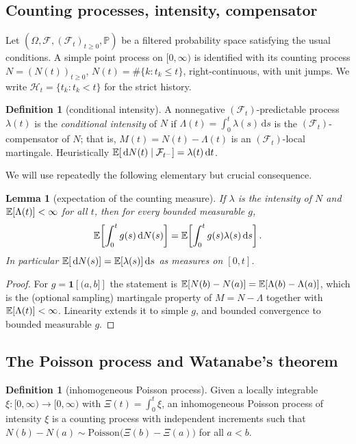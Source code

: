 \documentclass[11pt]{article}
\theoremstyle{plain}
\newtheorem{lemma}[theorem]{Lemma}
\theoremstyle{definition}
\newtheorem{definition}[theorem]{Definition}
\theoremstyle{remark}
\newcommand{\Prob}{\mathbb{P}}\newcommand{\one}{\mathbf{1}}\newcommand{\dd}{\,\mathrm{d}}
\newcommand{\Hist}{\mathcal{H}}\newcommand{\Filt}{\mathcal{F}}\newcommand{\conv}{\ast}
\newcommand{\ind}[1]{\mathbf{1}\!\left[#1\right]}
\begin{document}
\subsection{Counting processes, intensity, compensator}

Let $(\Omega,\Filt,(\Filt_t)_{t\ge0},\Prob)$ be a filtered probability space
satisfying the usual conditions. A simple point process on $[0,\infty)$ is
identified with its counting process $N=(N(t))_{t\ge0}$, $N(t)=\#\{k:t_k\le t\}$,
right-continuous, with unit jumps. We write $\Hist_t=\{t_k:t_k<t\}$ for the
strict history.

\begin{definition}[conditional intensity]
A nonnegative $(\Filt_t)$-predictable process $\lambda(t)$ is the
\emph{conditional intensity} of $N$ if
$\Lambda(t)=\int_0^t\lambda(s)\dd s$ is the $(\Filt_t)$-compensator of $N$; that
is, $M(t)=N(t)-\Lambda(t)$ is an $(\Filt_t)$-local martingale. Heuristically
$\E[\dd N(t)\mid\Filt_{t^-}]=\lambda(t)\dd t$.
\end{definition}

We will use repeatedly the following elementary but crucial consequence.

\begin{lemma}[expectation of the counting measure]
\label{lem:campbell}
If $\lambda$ is the intensity of $N$ and $\mathbb{E}[\Lambda(t)]<\infty$ for all $t$, then
for every bounded measurable $g$,
\[
\E\!\left[\int_0^t g(s)\dd N(s)\right]=\E\!\left[\int_0^t g(s)\lambda(s)\dd s\right].
\]
In particular $\E[\dd N(s)]=\E[\lambda(s)]\dd s$ as measures on $[0,t]$.
\end{lemma}
\begin{proof}
For $g=\ind{(a,b]}$ the statement is $\mathbb{E}[N(b)-N(a)]=\mathbb{E}[\Lambda(b)-\Lambda(a)]$,
which is the (optional sampling) martingale property of $M=N-\Lambda$ together
with $\mathbb{E}[\Lambda(t)]<\infty$. Linearity extends it to simple $g$, and bounded
convergence to bounded measurable $g$.
\end{proof}

\subsection{The Poisson process and Watanabe's theorem}

\begin{definition}[inhomogeneous Poisson process]
Given a locally integrable $\xi:[0,\infty)\to[0,\infty)$ with
$\Xi(t)=\int_0^t\xi$, an inhomogeneous Poisson process of intensity $\xi$ is a
counting process with independent increments such that
$N(b)-N(a)\sim\mathrm{Poisson}\!\big(\Xi(b)-\Xi(a)\big)$ for all $a<b$.
\end{definition}
\end{document}
